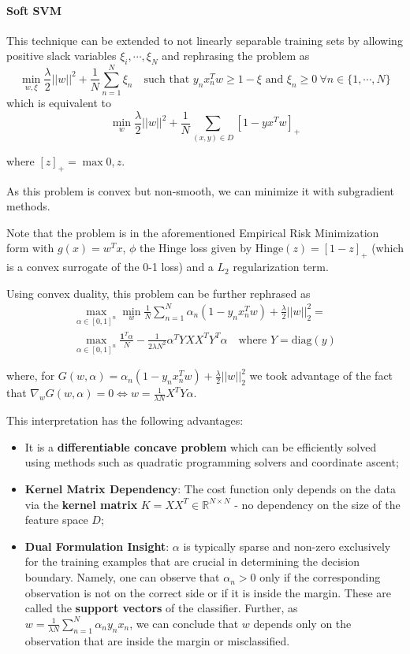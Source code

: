 \documentclass{article}
\newcommand{\R}{\mathbb{R}}
\begin{document}
\paragraph{Soft SVM}

This technique can be extended to not linearly separable training sets by allowing positive slack variables $\xi_i, \cdots, \xi_N$ and rephrasing the problem as
$$
\min_{w, \xi} \frac{\lambda}{2} ||w||^2 + \frac{1}{N} \sum_{n=1}^N \xi_n
\quad \text{such that } y_n x_n^T w \geq 1 - \xi \text{ and } \xi_n \geq 0 \ \forall n \in \{1, \cdots, N\}
$$
which is equivalent to
$$
\min_w \frac{\lambda}{2} ||w||^2 + \frac{1}{N} \sum_{(x,y) \in D} [1 - y x^T w]_+
$$

where $[z]_+ = \max{0, z}$.

As this problem is convex but non-smooth, we can minimize it with subgradient methods.

Note that the problem is in the aforementioned Empirical Risk Minimization form with $g(x) = w^T x$, $\phi$ the Hinge loss given by $\text{Hinge}(z) = [1-z]_+$ (which is a convex surrogate of the 0-1 loss) and a $L_2$ regularization term.

Using convex duality, this problem can be further rephrased as
\begin{gather*}
\max_{\alpha \in [0,1]^n} \min_w \frac{1}{N} \sum_{n=1}^N 
    \alpha_n (1 - y_n x_n^T w) + \frac{\lambda}{2} ||w||_2^2 = \\
\max_{\alpha \in [0,1]^n} 
    \frac{\mathbf{1}^T \alpha}{N} - \frac{1}{2\lambda N^2} \alpha^T YXX^TY^T \alpha \quad \text{where } Y = \text{diag}(y)
\end{gather*}

where, for $G(w, \alpha) = \alpha_n (1 - y_n x_n^T w) + \frac{\lambda}{2} ||w||_2^2$ we took advantage of the fact that $\nabla_w G(w, \alpha) = 0 \Leftrightarrow w = \frac{1}{\lambda N} X^T Y \alpha$. 

This interpretation has the following advantages:
\begin{itemize}
    \item It is a \textbf{differentiable concave problem} which can be efficiently solved using methods such as quadratic programming solvers and coordinate ascent;
    \item \textbf{Kernel Matrix Dependency}: The cost function only depends on the data via the \textbf{kernel matrix} $K = XX^T \in \R^{N \times N}$ - no dependency on the size of the feature space $D$;
    \item \textbf{Dual Formulation Insight}: $\alpha$ is typically sparse and non-zero exclusively for the training examples that are crucial in determining the decision boundary.
    Namely, one can observe that $\alpha_n > 0$ only if the corresponding observation is not on the correct side or if it is inside the margin.
    These are called the \textbf{support vectors} of the classifier.
    Further, as $w = \frac{1}{\lambda N} \sum_{n=1}^N \alpha_n y_n x_n$, we can conclude that $w$ depends only on the observation that are inside the margin or misclassified.
\end{itemize}
\end{document}
